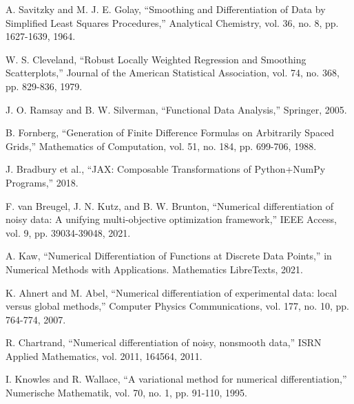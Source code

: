 \documentclass[10pt,journal,compsoc]{IEEEtran}
\begin{document}
\begin{thebibliography}{00}
 A. Savitzky and M. J. E. Golay, ``Smoothing and Differentiation of Data by Simplified Least Squares Procedures,'' Analytical Chemistry, vol. 36, no. 8, pp. 1627-1639, 1964.

 W. S. Cleveland, ``Robust Locally Weighted Regression and Smoothing Scatterplots,'' Journal of the American Statistical Association, vol. 74, no. 368, pp. 829-836, 1979.

 J. O. Ramsay and B. W. Silverman, ``Functional Data Analysis,'' Springer, 2005.

 B. Fornberg, ``Generation of Finite Difference Formulas on Arbitrarily Spaced Grids,'' Mathematics of Computation, vol. 51, no. 184, pp. 699-706, 1988.

 J. Bradbury et al., ``JAX: Composable Transformations of Python+NumPy Programs,'' 2018.

 F. van Breugel, J. N. Kutz, and B. W. Brunton, ``Numerical differentiation of noisy data: A unifying multi-objective optimization framework,'' IEEE Access, vol. 9, pp. 39034-39048, 2021.

 A. Kaw, ``Numerical Differentiation of Functions at Discrete Data Points,'' in Numerical Methods with Applications. Mathematics LibreTexts, 2021.

 K. Ahnert and M. Abel, ``Numerical differentiation of experimental data: local versus global methods,'' Computer Physics Communications, vol. 177, no. 10, pp. 764-774, 2007.

 R. Chartrand, ``Numerical differentiation of noisy, nonsmooth data,'' ISRN Applied Mathematics, vol. 2011, 164564, 2011.

 I. Knowles and R. Wallace, ``A variational method for numerical differentiation,'' Numerische Mathematik, vol. 70, no. 1, pp. 91-110, 1995.
\end{thebibliography}
\end{document}
